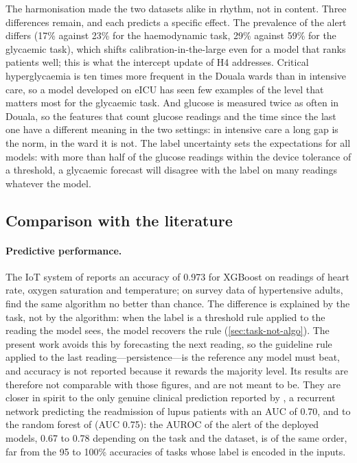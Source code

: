 The harmonisation made the two datasets alike in rhythm, not in content. Three differences remain, and each predicts a specific effect. The prevalence of the alert differs (17\% against 23\% for the haemodynamic task, 29\% against 59\% for the glycaemic task), which shifts calibration-in-the-large even for a model that ranks patients well; this is what the intercept update of H4 addresses. Critical hyperglycaemia is ten times more frequent in the Douala wards than in intensive care, so a model developed on eICU has seen few examples of the level that matters most for the glycaemic task. And glucose is measured twice as often in Douala, so the features that count glucose readings and the time since the last one have a different meaning in the two settings: in intensive care a long gap is the norm, in the ward it is not. The label uncertainty sets the expectations for all models: with more than half of the glucose readings within the device tolerance of a threshold, a glycaemic forecast will disagree with the label on many readings whatever the model.

\subsection{Comparison with the literature}

\paragraph{Predictive performance.} The IoT system of \textcite{efendi2025} reports an accuracy of 0.973 for XGBoost on readings of heart rate, oxygen saturation and temperature; on survey data of hypertensive adults, \textcite{mendoza2025} find the same algorithm no better than chance. The difference is explained by the task, not by the algorithm: when the label is a threshold rule applied to the reading the model sees, the model recovers the rule (\cref{sec:task-not-algo}). The present work avoids this by forecasting the next reading, so the guideline rule applied to the last reading---persistence---is the reference any model must beat, and accuracy is not reported because it rewards the majority level. Its results are therefore not comparable with those figures, and are not meant to be. They are closer in spirit to the only genuine clinical prediction reported by \textcite{liu2025review}, a recurrent network predicting the readmission of lupus patients with an AUC of 0.70, and to the random forest of \textcite{mendoza2025} (AUC 0.75): the AUROC of the alert of the deployed models, 0.67 to 0.78 depending on the task and the dataset, is of the same order, far from the 95 to 100\% accuracies of tasks whose label is encoded in the inputs.

